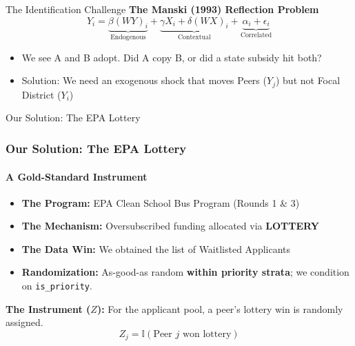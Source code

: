 \documentclass[10pt]{beamer}
\begin{document}
\begin{frame}{The Identification Challenge}
  \textbf{The Manski (1993) Reflection Problem}
  \begin{equation*}
    Y_i = \underbrace{\beta (W Y)_i}_{\text{Endogenous}} + \underbrace{\gamma X_i + \delta (W X)_i}_{\text{Contextual}} + \underbrace{\alpha_i + \epsilon_i}_{\text{Correlated}}
  \end{equation*}

  \begin{itemize}
    \item We see A and B adopt. Did A copy B, or did a state subsidy hit both?
    \item \alert{Solution:} We need an exogenous shock that moves Peers ($Y_j$) but not Focal District ($Y_i$)
  \end{itemize}
\end{frame}

\begin{frame}{Our Solution: The EPA Lottery}
  \frametitle{Our Solution: The EPA Lottery}
  \framesubtitle{A Gold-Standard Instrument}

  \begin{itemize}
    \item \textbf{The Program:} EPA Clean School Bus Program (Rounds 1 \& 3)
    \item \textbf{The Mechanism:} Oversubscribed funding allocated via \textbf{LOTTERY}
    \item \textbf{The Data Win:} We obtained the list of \alert{Waitlisted Applicants}
    \item \textbf{Randomization:} As-good-as random \textbf{within priority strata}; we condition on \texttt{is\_priority}.
  \end{itemize}

  \vspace{1em}
  \textbf{The Instrument ($Z$):}
  For the applicant pool, a peer's lottery win is \alert{randomly assigned}.
  $$ Z_{j} = \mathbb{I}(\text{Peer } j \text{ won lottery}) $$
\end{frame}
\end{document}

